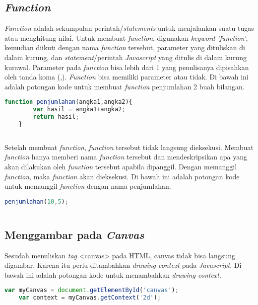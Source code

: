 \subsection{\textit{Function}}
\textit{Function} adalah sekumpulan perintah/\textit{statements} untuk menjalankan suatu tugas atau menghitung nilai. Untuk membuat \textit{function}, digunakan \textit{keyword 'function'}, kemudian diikuti dengan nama \textit{function} tersebut, parameter yang dituliskan di dalam kurung, dan \textit{statement}/perintah \textit{Javascript} yang ditulis di dalam kurung kurawal. Parameter pada \textit{function} bisa lebih dari 1 yang penulisanya dipisahkan oleh tanda koma (,). \textit{Function} bisa memiliki parameter atau tidak. Di bawah ini adalah potongan kode untuk membuat \textit{function} penjumlahan 2 buah bilangan.

\begin{lstlisting}[language=Javascript, caption=\textit{Function} penjumlahan 2 buah bilangan]
	function penjumlahan(angka1,angka2){
		var hasil = angka1+angka2;
		return hasil;
	}
	
\end{lstlisting}

Setelah membuat \textit{function}, \textit{function} tersebut tidak langsung dieksekusi. Membuat \textit{function} hanya memberi nama \textit{function} tersebut dan mendeskripsikan apa yang akan dilakukan oleh \textit{function} tersebut apabila dipanggil. Dengan memanggil \textit{function}, maka \textit{function} akan dieksekusi. Di bawah ini adalah potongan kode untuk memanggil \textit{function} dengan nama penjumlahan.

\begin{lstlisting}[language=Javascript, caption=Memanggil \textit{function} penjumlahan]
	penjumlahan(10,5);
	
\end{lstlisting}

\subsection{Menggambar pada \textit{Canvas}}
Sesudah menuliskan \textit{tag} <canvas> pada HTML, canvas tidak bisa langsung digambar. Karena itu perlu ditambahkan \textit{drawing context} pada \textit{Javascript}. Di bawah ini adalah potongan kode untuk menambahkan \textit{drawing context}.

\begin{lstlisting}[language=Javascript, caption=Menambahkan \textit{drawing context canvas}]
	var myCanvas = document.getElementById('canvas');
	var context = myCanvas.getContext('2d');
\end{lstlisting}

